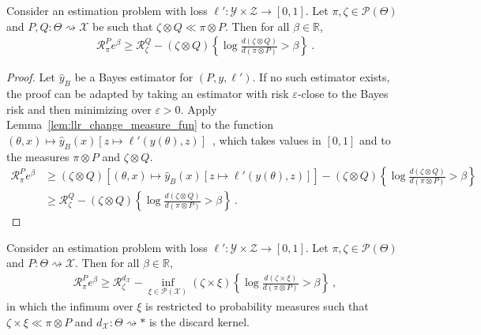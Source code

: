 \begin{lemma}
  \label{lem:change_measure_risk}
  Consider an estimation problem with loss $\ell' : \mathcal Y \times \mathcal Z \to [0,1]$. Let $\pi, \zeta \in \mathcal P(\Theta)$ and $P, Q : \Theta \rightsquigarrow \mathcal X$ be such that $\zeta \otimes Q \ll \pi \otimes P$. Then for all $\beta \in \mathbb{R}$,
  \begin{align*}
  \mathcal R_\pi^P e^{\beta}
  \ge \mathcal R_\zeta^Q - (\zeta \otimes Q)\left\{ \log\frac{d (\zeta \otimes Q)}{d (\pi \otimes P)} > \beta \right\}
  \: .
  \end{align*}
\end{lemma}

\begin{proof}%
{}
Let $\hat{y}_B$ be a Bayes estimator for $(P, y, \ell')$. If no such estimator exists, the proof can be adapted by taking an estimator with risk $\varepsilon$-close to the Bayes risk and then minimizing over $\varepsilon > 0$.
Apply Lemma~\ref{lem:llr_change_measure_fun} to the function $(\theta, x) \mapsto \hat{y}_B(x)\left[ z \mapsto \ell'(y(\theta), z) \right]$~, which takes values in $[0,1]$ and to the measures $\pi \otimes P$ and $\zeta \otimes Q$.
\begin{align*}
\mathcal R_\pi^P e^{\beta}
&\ge (\zeta \otimes Q)\left[ (\theta, x) \mapsto \hat{y}_B(x)\left[ z \mapsto \ell'(y(\theta), z) \right] \right]
  - (\zeta \otimes Q)\left\{ \log\frac{d (\zeta \otimes Q)}{d (\pi \otimes P)} > \beta \right\}
\\
&\ge \mathcal R_\zeta^Q - (\zeta \otimes Q)\left\{ \log\frac{d (\zeta \otimes Q)}{d (\pi \otimes P)} > \beta \right\}
\: .
\end{align*}
\end{proof}


\begin{lemma}
  \label{lem:change_measure_risk_inf}
  Consider an estimation problem with loss $\ell' : \mathcal Y \times \mathcal Z \to [0,1]$. Let $\pi, \zeta \in \mathcal P(\Theta)$ and $P : \Theta \rightsquigarrow \mathcal X$. Then for all $\beta \in \mathbb{R}$,
  \begin{align*}
  \mathcal R_\pi^P e^{\beta}
  \ge \mathcal R_\zeta^{d_{\mathcal X}} - \inf_{\xi \in \mathcal P(\mathcal X)}(\zeta \times \xi)\left\{ \log\frac{d (\zeta \times \xi)}{d (\pi \otimes P)} > \beta \right\}
  \: ,
  \end{align*}
  in which the infimum over $\xi$ is restricted to probability measures such that $\zeta \times \xi \ll \pi \otimes P$ and $d_{\mathcal X} : \Theta \rightsquigarrow *$ is the discard kernel.
\end{lemma}

